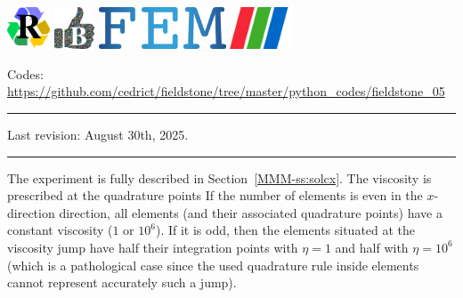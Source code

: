 \noindent
\includegraphics[height=1.25cm]{images/pictograms/replication}
\includegraphics[height=1.25cm]{images/pictograms/benchmark}
\includegraphics[height=1.25cm]{images/pictograms/FEM}
\includegraphics[height=1.25cm]{images/pictograms/paraview}


%

\begin{center}
\inpython
\infortran
{\small Codes: \url{https://github.com/cedrict/fieldstone/tree/master/python_codes/fieldstone_05}}
\end{center}

\par\noindent\rule{\textwidth}{0.4pt}

Last revision: August 30th, 2025.

\par\noindent\rule{\textwidth}{0.4pt}


The experiment is fully described in Section~\ref{MMM-ss:solcx}.
The viscosity is prescribed at the quadrature points 
If the number of elements is even in the $x$-direction direction, all elements 
(and their associated quadrature points)
have a constant viscosity ($1$ or  $10^6$). If it is odd, then the elements situated 
at the viscosity jump have half their integration points with $\eta=1$ and half 
with $\eta=10^6$ 
(which is a pathological case since the used quadrature rule inside elements cannot represent 
accurately such a jump).  

